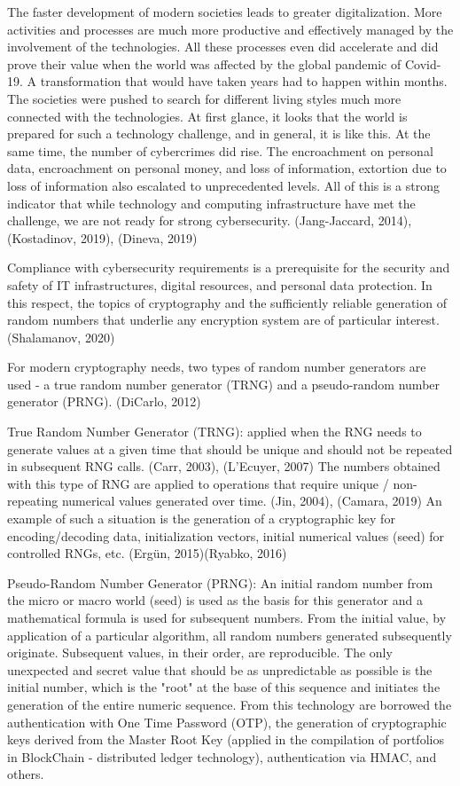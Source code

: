 \documentclass[graybox]{svmult}
\begin{document}
The faster development of modern societies leads to greater digitalization. More activities and processes are much more productive and effectively managed by the involvement of the technologies. All these processes even did accelerate and did prove their value when the world was affected by the global pandemic of Covid-19. A transformation that would have taken years had to happen within months. The societies were pushed to search for different living styles much more connected with the technologies. At first glance, it looks that the world is prepared for such a technology challenge, and in general, it is like this. At the same time, the number of cybercrimes did rise. The encroachment on personal data, encroachment on personal money, and loss of information, extortion due to loss of information also escalated to unprecedented levels. All of this is a strong indicator that while technology and computing infrastructure have met the challenge, we are not ready for strong cybersecurity. (Jang-Jaccard, 2014), (Kostadinov, 2019), (Dineva, 2019)

Compliance with cybersecurity requirements is a prerequisite for the security and safety of IT infrastructures, digital resources, and personal data protection. In this respect, the topics of cryptography and the sufficiently reliable generation of random numbers that underlie any encryption system are of particular interest. (Shalamanov, 2020)

For modern cryptography needs, two types of random number generators are used - a true random number generator (TRNG) and a pseudo-random number generator (PRNG). (DiCarlo, 2012) 

True Random Number Generator (TRNG): applied when the RNG needs to generate values at a given time that should be unique and should not be repeated in subsequent RNG calls. (Carr, 2003), (L'Ecuyer, 2007) The numbers obtained with this type of RNG are applied to operations that require unique / non-repeating numerical values generated over time. (Jin, 2004), (Camara, 2019) An example of such a situation is the generation of a cryptographic key for encoding/decoding data, initialization vectors, initial numerical values (seed) for controlled RNGs, etc. (Ergün, 2015)(Ryabko, 2016)

Pseudo-Random Number Generator (PRNG): An initial random number from the micro or macro world (seed) is used as the basis for this generator and a mathematical formula is used for subsequent numbers. From the initial value, by application of a particular algorithm, all random numbers generated subsequently originate. Subsequent values, in their order, are reproducible. The only unexpected and secret value that should be as unpredictable as possible is the initial number, which is the "root" at the base of this sequence and initiates the generation of the entire numeric sequence. From this technology are borrowed the authentication with One Time Password (OTP), the generation of cryptographic keys derived from the Master Root Key (applied in the compilation of portfolios in BlockChain - distributed ledger technology), authentication via HMAC, and others.
\end{document}
